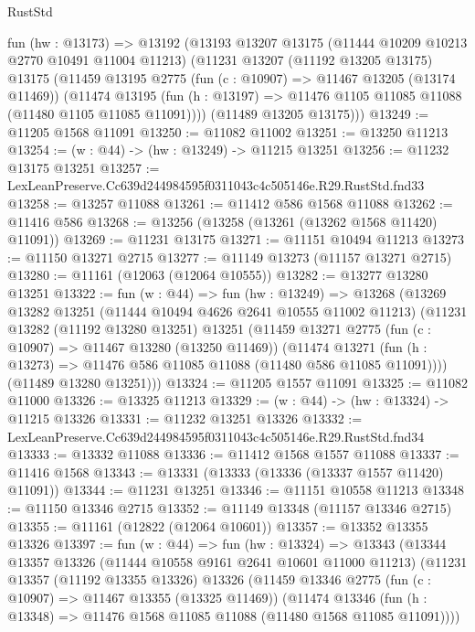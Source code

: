 \begin{lexlean}{RustStd}
\begin{coremodule}
  fun (hw : @13173) =>
  @13192
    (@13193
      @13207
      @13175
      (@11444 @10209 @10213 @2770 @10491 @11004 @11213)
      (@11231
        @13207
        (@11192 @13205 @13175)
        @13175
        (@11459
          @13195
          @2775
          (fun (c : @10907) => @11467 @13205 (@13174 @11469))
          (@11474
            @13195
            (fun (h : @13197) => @11476 @1105 @11085 @11088 (@11480 @1105 @11085 @11091))))
        (@11489 @13205 @13175)))
@13249 := @11205 @1568 @11091
@13250 := @11082 @11002
@13251 := @13250 @11213
@13254 := (w : @44) -> (hw : @13249) -> @11215 @13251
@13256 := @11232 @13175 @13251
@13257 := LexLeanPreserve.Cc639d244984595f0311043c4c505146e.R29.RustStd.fnd33
@13258 := @13257 @11088
@13261 := @11412 @586 @1568 @11088
@13262 := @11416 @586
@13268 := @13256 (@13258 (@13261 (@13262 @1568 @11420) @11091))
@13269 := @11231 @13175
@13271 := @11151 @10494 @11213
@13273 := @11150 @13271 @2715
@13277 := @11149 @13273 (@11157 @13271 @2715)
@13280 := @11161 (@12063 (@12064 @10555))
@13282 := @13277 @13280 @13251
@13322 := fun (w : @44) =>
  fun (hw : @13249) =>
  @13268
    (@13269
      @13282
      @13251
      (@11444 @10494 @4626 @2641 @10555 @11002 @11213)
      (@11231
        @13282
        (@11192 @13280 @13251)
        @13251
        (@11459
          @13271
          @2775
          (fun (c : @10907) => @11467 @13280 (@13250 @11469))
          (@11474
            @13271
            (fun (h : @13273) => @11476 @586 @11085 @11088 (@11480 @586 @11085 @11091))))
        (@11489 @13280 @13251)))
@13324 := @11205 @1557 @11091
@13325 := @11082 @11000
@13326 := @13325 @11213
@13329 := (w : @44) -> (hw : @13324) -> @11215 @13326
@13331 := @11232 @13251 @13326
@13332 := LexLeanPreserve.Cc639d244984595f0311043c4c505146e.R29.RustStd.fnd34
@13333 := @13332 @11088
@13336 := @11412 @1568 @1557 @11088
@13337 := @11416 @1568
@13343 := @13331 (@13333 (@13336 (@13337 @1557 @11420) @11091))
@13344 := @11231 @13251
@13346 := @11151 @10558 @11213
@13348 := @11150 @13346 @2715
@13352 := @11149 @13348 (@11157 @13346 @2715)
@13355 := @11161 (@12822 (@12064 @10601))
@13357 := @13352 @13355 @13326
@13397 := fun (w : @44) =>
  fun (hw : @13324) =>
  @13343
    (@13344
      @13357
      @13326
      (@11444 @10558 @9161 @2641 @10601 @11000 @11213)
      (@11231
        @13357
        (@11192 @13355 @13326)
        @13326
        (@11459
          @13346
          @2775
          (fun (c : @10907) => @11467 @13355 (@13325 @11469))
          (@11474
            @13346
            (fun (h : @13348) => @11476 @1568 @11085 @11088 (@11480 @1568 @11085 @11091))))

\end{coremodule}
\end{lexlean}

